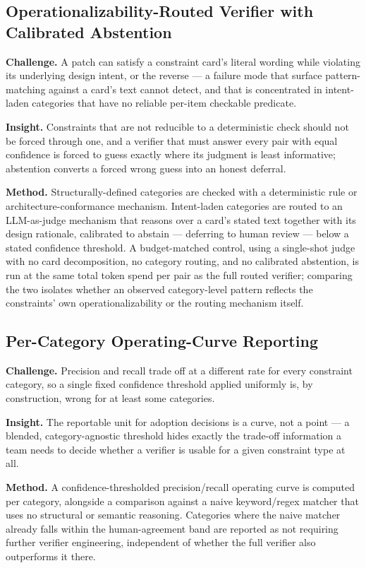\documentclass[11pt]{article}
\begin{document}
\subsection{Operationalizability-Routed Verifier with Calibrated Abstention}
\textbf{Challenge.} A patch can satisfy a constraint card's literal wording while violating its underlying design intent, or the reverse --- a failure mode that surface pattern-matching against a card's text cannot detect, and that is concentrated in intent-laden categories that have no reliable per-item checkable predicate.

\textbf{Insight.} Constraints that are not reducible to a deterministic check should not be forced through one, and a verifier that must answer every pair with equal confidence is forced to guess exactly where its judgment is least informative; abstention converts a forced wrong guess into an honest deferral.

\textbf{Method.} Structurally-defined categories are checked with a deterministic rule or architecture-conformance mechanism. Intent-laden categories are routed to an LLM-as-judge mechanism that reasons over a card's stated text together with its design rationale, calibrated to abstain --- deferring to human review --- below a stated confidence threshold. A budget-matched control, using a single-shot judge with no card decomposition, no category routing, and no calibrated abstention, is run at the same total token spend per pair as the full routed verifier; comparing the two isolates whether an observed category-level pattern reflects the constraints' own operationalizability or the routing mechanism itself.

\subsection{Per-Category Operating-Curve Reporting}
\textbf{Challenge.} Precision and recall trade off at a different rate for every constraint category, so a single fixed confidence threshold applied uniformly is, by construction, wrong for at least some categories.

\textbf{Insight.} The reportable unit for adoption decisions is a curve, not a point --- a blended, category-agnostic threshold hides exactly the trade-off information a team needs to decide whether a verifier is usable for a given constraint type at all.

\textbf{Method.} A confidence-thresholded precision/recall operating curve is computed per category, alongside a comparison against a naive keyword/regex matcher that uses no structural or semantic reasoning. Categories where the naive matcher already falls within the human-agreement band are reported as not requiring further verifier engineering, independent of whether the full verifier also outperforms it there.
\end{document}

